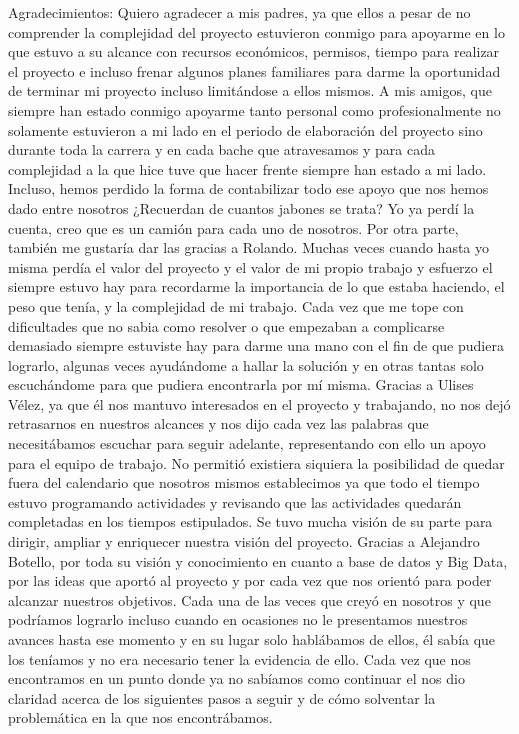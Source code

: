 Agradecimientos:
Quiero agradecer a mis padres, ya que ellos a pesar de no comprender la complejidad del proyecto estuvieron conmigo para apoyarme en lo que estuvo a su alcance con recursos económicos, permisos, tiempo para realizar el proyecto e incluso frenar algunos planes familiares para darme la oportunidad de terminar mi proyecto incluso limitándose a ellos mismos.
A mis amigos, que siempre han estado conmigo apoyarme tanto personal como profesionalmente no solamente estuvieron a mi lado en el periodo de elaboración del proyecto sino durante toda la carrera y en cada bache que atravesamos y para cada complejidad a la que hice tuve que hacer frente siempre han estado a mi lado. Incluso, hemos perdido la forma de contabilizar todo ese apoyo que nos hemos dado entre nosotros ¿Recuerdan de cuantos jabones se trata? Yo ya perdí la cuenta, creo que es un camión para cada uno de nosotros. 
Por otra parte, también me gustaría dar las gracias a Rolando. Muchas veces cuando hasta yo misma perdía el valor del proyecto y el valor de mi propio trabajo y esfuerzo el siempre estuvo hay para recordarme la importancia de lo que estaba haciendo, el peso que tenía, y la complejidad de mi trabajo.
Cada vez que me tope con dificultades que no sabia como resolver o que empezaban a complicarse demasiado siempre estuviste hay para darme una mano con el fin de que pudiera lograrlo, algunas veces ayudándome a hallar la solución y en otras tantas solo escuchándome para que pudiera encontrarla por mí misma.
Gracias a Ulises Vélez, ya que él nos mantuvo interesados en el proyecto y trabajando, no nos dejó retrasarnos en nuestros alcances y nos dijo cada vez las palabras que necesitábamos escuchar para seguir adelante, representando con ello un apoyo para el equipo de trabajo. 
No permitió existiera siquiera la posibilidad de quedar fuera del calendario que nosotros mismos establecimos ya que todo el tiempo estuvo programando actividades y revisando que las actividades quedarán completadas en los tiempos estipulados.
Se tuvo mucha visión de su parte para dirigir, ampliar y enriquecer nuestra visión del proyecto.
Gracias a Alejandro Botello, por toda su visión y conocimiento en cuanto a base de datos y Big Data, por las ideas que aportó al proyecto y por cada vez que nos orientó para poder alcanzar nuestros objetivos.
Cada una de las veces que creyó en nosotros y que podríamos lograrlo incluso cuando en ocasiones no le presentamos nuestros  avances hasta ese momento y en su lugar solo hablábamos de ellos, él sabía que los teníamos y no era necesario tener la evidencia de ello. Cada vez que nos encontramos en un punto donde ya no sabíamos como continuar el nos dio claridad acerca de los siguientes pasos a seguir y de cómo solventar la problemática en la que nos encontrábamos.
